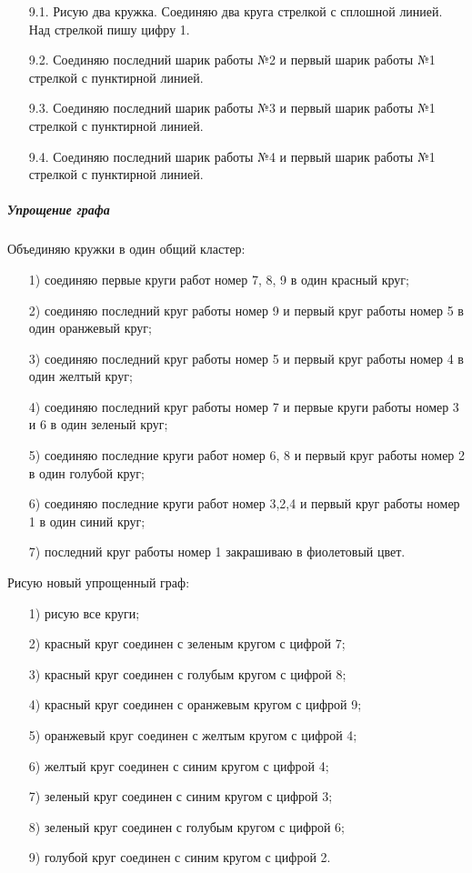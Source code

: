 \begin{enumerate}
  \item[9.1.] Рисую два кружка. Соединяю два круга стрелкой с сплошной линией. Над стрелкой пишу цифру 1.
  \item[9.2.] Соединяю последний шарик работы №2 и первый шарик работы №1 стрелкой с пунктирной линией.
  \item[9.3.] Соединяю последний шарик работы №3 и первый шарик работы №1 стрелкой с пунктирной линией.
  \item[9.4.] Соединяю последний шарик работы №4 и первый шарик работы №1 стрелкой с пунктирной линией.
\end{enumerate}

\subparagraph{Упрощение графа} \hspace{0pt}

Объединяю кружки в один общий кластер:
\begin{enumerate}
  \item[1)] соединяю первые круги работ номер 7, 8, 9 в один красный круг;
  \item[2)] соединяю последний круг работы номер 9 и первый круг работы номер 5 в один оранжевый круг;
  \item[3)] соединяю последний круг работы номер 5 и первый круг работы номер 4 в один желтый круг;
  \item[4)] соединяю последний круг работы номер 7 и первые круги работы номер 3 и 6 в один зеленый круг;
  \item[5)] соединяю последние круги работ номер 6, 8 и первый круг работы номер 2 в один голубой круг;
  \item[6)] соединяю последние круги работ номер 3,2,4 и первый круг работы номер 1 в один синий круг;
  \item[7)] последний круг работы номер 1 закрашиваю в фиолетовый цвет. 
\end{enumerate}

Рисую новый упрощенный граф:
\begin{enumerate}
  \item[1)] рисую все круги;
  \item[2)] красный круг соединен с зеленым кругом с цифрой 7;
  \item[3)] красный круг соединен с голубым кругом с цифрой 8;
  \item[4)] красный круг соединен с оранжевым кругом с цифрой 9;
  \item[5)] оранжевый круг соединен с желтым кругом с цифрой 4;
  \item[6)] желтый круг соединен с синим кругом с цифрой 4;
  \item[7)] зеленый круг соединен с синим кругом с цифрой 3;
  \item[8)] зеленый круг соединен с голубым кругом с цифрой 6;
  \item[9)] голубой круг соединен с синим кругом с цифрой 2.
\end{enumerate}

